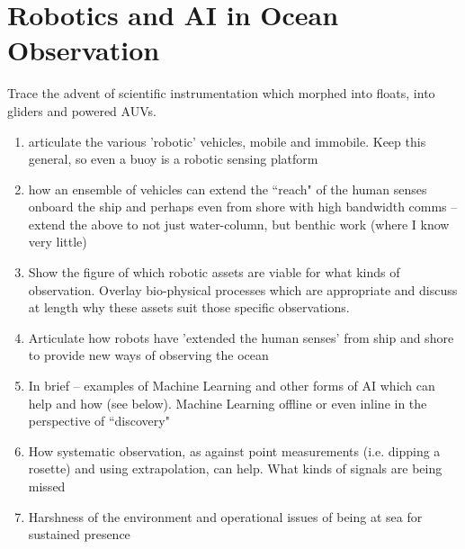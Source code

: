 \section{Robotics and AI in Ocean Observation}

Trace the advent of scientific instrumentation which morphed into
floats, into gliders and powered AUVs.

\begin{enumerate} 

  \item articulate the various 'robotic' vehicles, mobile and
    immobile. Keep this general, so even a buoy is a robotic sensing
    platform

  \item how an ensemble of vehicles can extend the “reach" of the
    human senses onboard the ship and perhaps even from shore with
    high bandwidth comms -- extend the above to not just water-column,
    but benthic work (where I know very little)

  \item Show the figure of which robotic assets are viable for what
    kinds of observation. Overlay bio-physical processes which are
    appropriate and discuss at length why these assets suit those
    specific observations.

  \item Articulate how robots have 'extended the human senses' from
    ship and shore to provide new ways of observing the ocean

  \item In brief -- examples of Machine Learning and other forms of AI
    which can help and how (see below). Machine Learning offline or
    even inline in the perspective of “discovery"

  \item How systematic observation, as against point measurements
    (i.e. dipping a rosette) and using extrapolation, can help. What
    kinds of signals are being missed

  \item Harshness of the environment and operational issues of being
    at sea for sustained presence

\end{enumerate}
